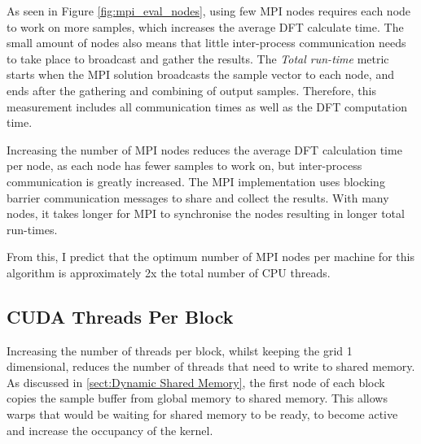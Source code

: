 \documentclass[11pt,a4paper]{article}
\begin{document}
As seen in Figure \ref{fig:mpi_eval_nodes}, using few MPI nodes requires each node to work on more samples, which increases the average DFT calculate time. The small amount of nodes also means that little inter-process communication needs to take place to broadcast and gather the results. The \textit{Total run-time} metric starts when the MPI solution broadcasts the sample vector to each node, and ends after the gathering and combining of output samples. Therefore, this measurement includes all communication times as well as the DFT computation time.

Increasing the number of MPI nodes reduces the average DFT calculation time per node, as each node has fewer samples to work on, but inter-process communication is greatly increased. The MPI implementation uses blocking barrier communication messages to share and collect the results. With many nodes, it takes longer for MPI to synchronise the nodes resulting in longer total run-times.

From this, I predict that the optimum number of MPI nodes per machine for this algorithm is approximately 2x the total number of CPU threads.

\subsection{CUDA Threads Per Block}
Increasing the number of threads per block, whilst keeping the grid 1 dimensional, reduces the number of threads that need to write to shared memory. As discussed in \ref{sect:Dynamic Shared Memory}, the first node of each block copies the sample buffer from global memory to shared memory. This allows warps that would be waiting for shared memory to be ready, to become active and increase the occupancy of the kernel.

\begin{figure}[H]%
    \centering
    \qquad
    \vspace{5pt}
    \caption{}%
    \label{fig:cuda_threads_per_block}%
\end{figure}
\end{document}
